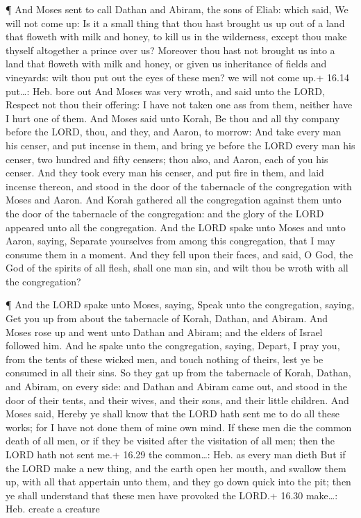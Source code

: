  ¶ And Moses sent to call Dathan and Abiram, the sons of
Eliab: which said, We will not come up:  Is it a small
thing that thou hast brought us up out of a land that floweth with milk
and honey, to kill us in the wilderness, except thou make thyself
altogether a prince over us?  Moreover thou hast not
brought us into a land that floweth with milk and honey, or given us
inheritance of fields and vineyards: wilt thou put out the eyes of these
men? we will not come up.+ 16.14 put\ldots: Heb. bore out 
And Moses was very wroth, and said unto the LORD, Respect not thou their
offering: I have not taken one ass from them, neither have I hurt one of
them.  And Moses said unto Korah, Be thou and all thy
company before the LORD, thou, and they, and Aaron, to morrow:
 And take every man his censer, and put incense in them,
and bring ye before the LORD every man his censer, two hundred and fifty
censers; thou also, and Aaron, each of you his censer.  And
they took every man his censer, and put fire in them, and laid incense
thereon, and stood in the door of the tabernacle of the congregation
with Moses and Aaron.  And Korah gathered all the
congregation against them unto the door of the tabernacle of the
congregation: and the glory of the LORD appeared unto all the
congregation.  And the LORD spake unto Moses and unto
Aaron, saying,  Separate yourselves from among this
congregation, that I may consume them in a moment.  And
they fell upon their faces, and said, O God, the God of the spirits of
all flesh, shall one man sin, and wilt thou be wroth with all the
congregation?

 ¶ And the LORD spake unto Moses, saying, 
Speak unto the congregation, saying, Get you up from about the
tabernacle of Korah, Dathan, and Abiram.  And Moses rose up
and went unto Dathan and Abiram; and the elders of Israel followed him.
 And he spake unto the congregation, saying, Depart, I pray
you, from the tents of these wicked men, and touch nothing of theirs,
lest ye be consumed in all their sins.  So they gat up from
the tabernacle of Korah, Dathan, and Abiram, on every side: and Dathan
and Abiram came out, and stood in the door of their tents, and their
wives, and their sons, and their little children.  And
Moses said, Hereby ye shall know that the LORD hath sent me to do all
these works; for I have not done them of mine own mind.  If
these men die the common death of all men, or if they be visited after
the visitation of all men; then the LORD hath not sent me.+ 16.29 the
common\ldots: Heb. as every man dieth  But if the LORD make
a new thing, and the earth open her mouth, and swallow them up, with all
that appertain unto them, and they go down quick into the pit; then ye
shall understand that these men have provoked the LORD.+ 16.30
make\ldots: Heb. create a creature

